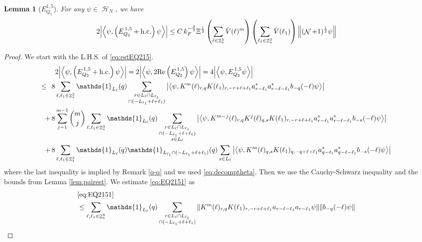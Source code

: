 \documentclass[sn-mathphys, Numbered ,a4paper]{sn-jnl}%
\DeclareMathOperator{\Z}{\mathbb{Z}}
\DeclareMathOperator{\HH}{\mathcal{H}}
\DeclareMathOperator{\NN}{\mathcal{N}}
\newcommand{\half}{\frac{1}{2}}
\newcommand{\eva}[1]{\left\langle #1 \right\rangle}
\theoremstyle{plain}
\newtheorem{lemma}[theorem]{Lemma}
\theoremstyle{definition}
\theoremstyle{remark}
\theoremstyle{plain}
\theoremstyle{definition}
\theoremstyle{remark}
\begin{document}
\begin{lemma}[$E_{Q_2}^{1,5}$]
For any $\psi \in \HH_N$, we have
	\begin{align}
    	2\abs{\eva{\psi,\left(E^{\,1,5}_{Q_2}+\mathrm{h.c.}\right) \psi }}
    	\leq C\, k_{F}^{-\frac{3}{2}} \Xi^{\half} \left(\sum\limits_{\ell\in \Z^3_*} \hat{V}(\ell)^m \right) \left(\sum\limits_{\ell_1\in \Z^3_*} \hat{V}(\ell_1) \right) \norm{(\NN+1)^\half \psi } \label{eq:estEQ215}
    \end{align}
\end{lemma}
\begin{proof}
We start with the L.H.S. of \eqref{eq:estEQ215}.
\begin{align}
    &2\abs{\eva{\psi,\left(E^{\,1,5}_{Q_2}+\mathrm{h.c.}\right) \psi }} = 2\abs{\eva{\psi,2\mathrm{Re}\left(E^{\,1,5}_{Q_2}\right) \psi }} = 4\abs{\eva{\psi, E^{\,1,5}_{Q_2} \psi }}\nonumber\\
    \leq\,\;8& \sum\limits_{\ell, \ell_1\in \Z^3_*} \mathds{1}_{L_{\ell}}(q) \sum\limits_{\substack{r\in L_{\ell} \cap L_{\ell_1} \\ \cap (-L_{\ell_1}+\ell+\ell_1)}} \abs{\eva{\psi,  K^m(\ell)_{r,q} K(\ell_1)_{r,-r+\ell+\ell_1}  a^*_{r-\ell_1}a^*_{r-\ell-\ell_1}b_{-q}(-\ell)\psi }} \label{eq:EQ2151}\\
    +\,8& \sum\limits_{j=1}^{m-1} {{m}\choose j} \sum\limits_{\ell, \ell_1\in \Z^3_*}\mathds{1}_{L_{\ell}}(q) \sum\limits_{\substack{r\in L_{\ell} \cap L_{\ell_1}\\ \cap (-L_{\ell_1}+\ell+\ell_1)\\ s \in L_{\ell}}}  \abs{\eva{\psi, K^{m-j}(\ell)_{r,q} K^j(\ell)_{q,s} K(\ell_1)_{r,-r+\ell+\ell_1}  a^*_{r-\ell_1}a^*_{r-\ell-\ell_1}b_{-s}(-\ell) \psi }} \label{eq:EQ2152}\\
    +\,8&\sum\limits_{\ell, \ell_1\in \Z^3_*} \mathds{1}_{L_{\ell}}(q) \mathds{1}_{L_{\ell_1}\cap (-L_{\ell_1}+\ell+\ell_1)}(q) \sum\limits_{ s \in L_{\ell}} \abs{\eva{\psi, K^m(\ell)_{q,s} K(\ell_1)_{q,-q+\ell+\ell_1}  a^*_{q-\ell_1} a^*_{q-\ell-\ell_1} b_{-s}(-\ell) \psi }} \label{eq:EQ2153}
\end{align}
where the last inequality is implied by Remark \ref{q-q} and we used \eqref{eq:decomptheta}.
Then we use the Cauchy-Schwarz inequality and the bounds from Lemma \ref{lem:pairest}.
We estimate \eqref{eq:EQ2151} as
\begin{align}
    &\eqref{eq:EQ2151}\nonumber\\
	&\leq \sum\limits_{\ell, \ell_1\in \Z^3_*} \mathds{1}_{L_{\ell}}(q) \sum\limits_{\substack{r\in L_{\ell} \cap L_{\ell_1} \\ \cap (-L_{\ell_1}+\ell+\ell_1)}} \norm{K^m(\ell)_{r,q} K(\ell_1)_{r,-r+\ell+\ell_1} a_{r-\ell-\ell_1} a_{r-\ell_1} \psi}\norm{  b_{-q}(-\ell) \psi}\nonumber\\

\end{align}
\end{proof}
\end{document}
